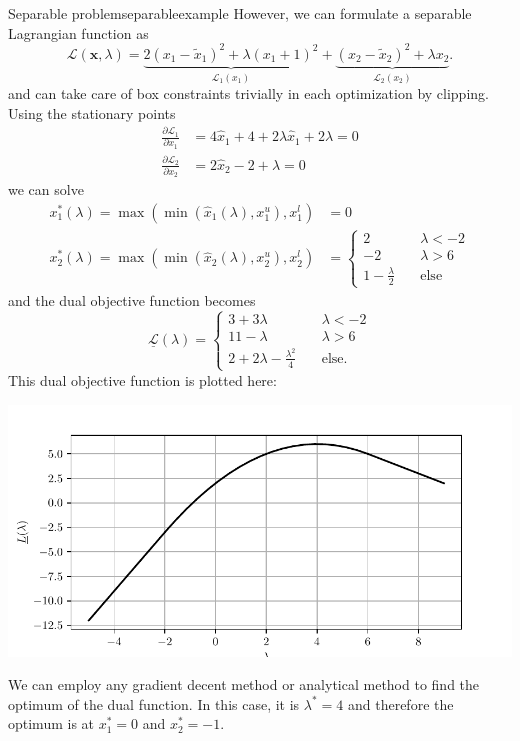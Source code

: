 \begin{example}{Separable problem}{separableexample}
    However, we can formulate a separable Lagrangian function as
    \begin{equation}
        \mathcal{L}(\mathbf{x}, \lambda) = \underbrace{2 (x_1-\tilde{x}_1)^2 + \lambda (x_1+1)^2}_{\mathcal{L}_1(x_1)} + \underbrace{(x_2-\tilde{x}_2)^2  + \lambda x_2}_{\mathcal{L}_2(x_2)}.
    \end{equation}
    and can take care of box constraints trivially in each optimization by clipping. Using the stationary points 
    \begin{align}
        \frac{\partial \mathcal{L}_1}{\partial x_1} &= 4\hat{x}_1+4+2\lambda \hat{x}_1 + 2 \lambda = 0 \\
        \frac{\partial \mathcal{L}_2}{\partial x_2} &= 2\hat{x}_2-2+\lambda = 0
    \end{align}
    we can solve 
    \begin{align}
        x_1^*(\lambda) = \max(\min(\hat{x}_1(\lambda), x_1^u), x_1^l) &= 0 \\
        x_2^*(\lambda) = \max(\min(\hat{x}_2(\lambda), x_2^u), x_2^l) &= 
        \begin{cases}
            2 & \quad \lambda < -2 \\
            -2 & \quad \lambda > 6 \\
            1 - \frac{\lambda}{2} & \quad \text{else}
        \end{cases}
    \end{align}
    and the dual objective function becomes 
    \begin{equation}
        \underline{\mathcal{L}}(\lambda) = 
        \begin{cases}
            3 + 3 \lambda  & \quad \lambda < -2 \\
            11 - \lambda  & \quad \lambda > 6 \\
            2 + 2 \lambda - \frac{\lambda^2}{4}   & \quad \text{else.}
        \end{cases}
    \end{equation}
    This dual objective function is plotted here:
    \begin{center}
        \includegraphics[width=\textwidth]{figures/dual_function.pdf}
    \end{center}
    We can employ any gradient decent method or analytical method to find the optimum of the dual function. In this case, it is $\lambda^*=4$ and therefore the optimum is at $x_1^*=0$ and $x_2^*=-1$.    
\end{example}


 